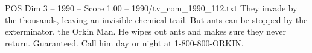 \begin{textsample}{POS Dim 3 – 1990 – Score 1.00 – 1990/tv\_com\_1990\_112.txt}  \label{ex:f3_pos_079}
They invade by the thousands, leaving an invisible chemical trail.
But ants can be stopped by the exterminator, the Orkin Man.
He wipes out ants and makes sure they never return.
Guaranteed.
Call him day or night at 1-800-800-ORKIN.

\end{textsample}
